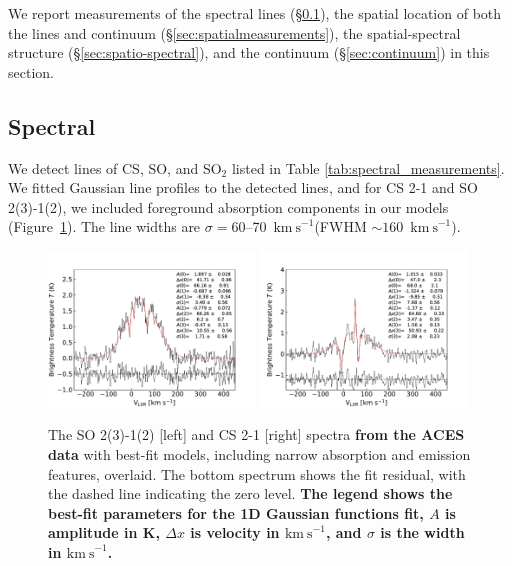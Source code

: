 \documentclass[]{aastex631}
\newcommand{\kms}{\ensuremath{\mathrm{km~s}^{-1}}\xspace}
\def\rr#1{\textbf{#1}}
\begin{document}
We report measurements of the spectral lines (\S \ref{sec:spectralmeasurements}), the spatial location of both the lines and continuum (\S \ref{sec:spatialmeasurements}), the spatial-spectral structure (\S \ref{sec:spatio-spectral}), and the continuum (\S \ref{sec:continuum}) in this section.


\subsection{Spectral}
\label{sec:spectralmeasurements}

We detect lines of CS, SO, and SO$_2$ listed in Table \ref{tab:spectral_measurements}.
We fitted Gaussian line profiles to the detected lines, and for CS 2-1 and SO 2(3)-1(2), we included foreground absorption components in our models (Figure~\ref{fig:fittedspectra}).
The line widths are $\sigma=60$--70~\kms (FWHM $\sim160$~\kms).

\begin{figure}[!ht]
    \includegraphics[width=0.49\textwidth]{figures/SO32_spectrum_absorption_fitted.pdf}
    \includegraphics[width=0.49\textwidth]{figures/CS21_spectrum_absorption_fitted.pdf}
    \caption{The SO 2(3)-1(2) [left] and CS 2-1 [right] spectra \rr{from the ACES data} with best-fit models, including narrow absorption and emission features, overlaid.
    The bottom spectrum shows the fit residual, with the dashed line indicating the zero level.
    \rr{The legend shows the best-fit parameters for the 1D Gaussian functions fit, $A$ is amplitude in K, $\Delta x$ is velocity in \kms, and $\sigma$ is the width in \kms.
    }
    }
    \label{fig:fittedspectra}
\end{figure}
\end{document}
